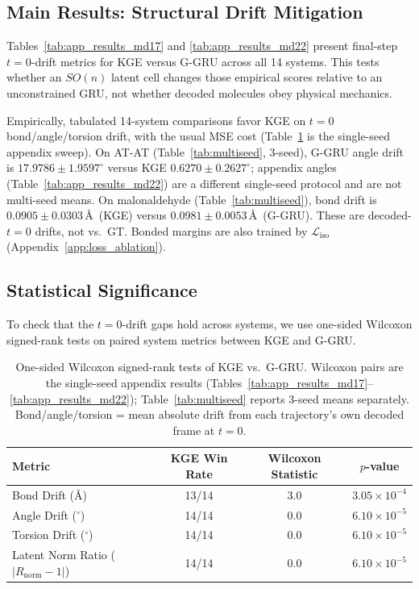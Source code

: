 \documentclass{article}
\newcommand{\GKE}{\textsc{KGE}}
\newcommand{\GGRU}{\textsc{G-GRU}}
\begin{document}
\subsection{Main Results: Structural Drift Mitigation}
\label{sec:main_results}

Tables~\ref{tab:app_results_md17} and \ref{tab:app_results_md22} present final-step $t=0$-drift metrics for \GKE{} versus \GGRU{} across all 14 systems. This tests whether an $SO(n)$ latent cell changes those empirical scores relative to an unconstrained GRU, not whether decoded molecules obey physical mechanics.

Empirically, tabulated 14-system comparisons favor \GKE{} on $t=0$ bond/angle/torsion drift, with the usual MSE cost (Table~\ref{tab:wilcoxon} is the single-seed appendix sweep). On AT-AT (Table~\ref{tab:multiseed}, 3-seed), \GGRU{} angle drift is $17.9786\pm 1.9597^\circ$ versus \GKE{} $0.6270\pm 0.2627^\circ$; appendix angles (Table~\ref{tab:app_results_md22}) are a different single-seed protocol and are not multi-seed means. On malonaldehyde (Table~\ref{tab:multiseed}), bond drift is $0.0905\pm 0.0303$\,\AA\ (\GKE{}) versus $0.0981\pm 0.0053$\,\AA\ (\GGRU{}). These are decoded-$t=0$ drifts, not vs.\ GT. Bonded margins are also trained by $\mathcal{L}_{\text{iso}}$ (Appendix~\ref{app:loss_ablation}).

\subsection{Statistical Significance}
\label{sec:stats}

To check that the $t=0$-drift gaps hold across systems, we use one-sided Wilcoxon signed-rank tests on paired system metrics between \GKE{} and \GGRU{}.

\begin{table}[htbp]
  \centering
  \caption{One-sided Wilcoxon signed-rank tests of \GKE{} vs.\ \GGRU{}. Wilcoxon pairs are the single-seed appendix results (Tables~\ref{tab:app_results_md17}--\ref{tab:app_results_md22}); Table~\ref{tab:multiseed} reports 3-seed means separately. Bond/angle/torsion = mean absolute drift from each trajectory's own decoded frame at $t=0$.}
  \label{tab:wilcoxon}
  \begin{tabular}{lccc}
    \toprule
    Metric & \GKE{} Win Rate & Wilcoxon Statistic & $p$-value \\
    \midrule
    Bond Drift (\AA)      & 13/14 & 3.0 & $3.05\times10^{-4}$ \\
    Angle Drift ($^\circ$) & 14/14 & 0.0 & $6.10\times10^{-5}$ \\
    Torsion Drift ($^\circ$)& 14/14 & 0.0 & $6.10\times10^{-5}$ \\
    Latent Norm Ratio ($|R_{\text{norm}} - 1|$) & 14/14 & 0.0 & $6.10\times10^{-5}$ \\
    \bottomrule
  \end{tabular}
\end{table}
\end{document}
